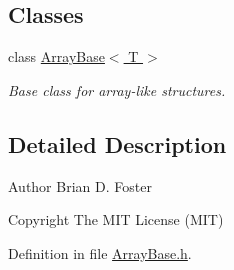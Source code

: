 \subsection*{Classes}
\begin{DoxyCompactItemize}
\item 
class \hyperlink{a00001}{Array\+Base$<$ T $>$}
\begin{DoxyCompactList}\small\item\em Base class for array-\/like structures. \end{DoxyCompactList}\end{DoxyCompactItemize}


\subsection{Detailed Description}
\begin{DoxyAuthor}{Author}
Brian D. Foster 
\end{DoxyAuthor}
\begin{DoxyCopyright}{Copyright}
The M\+I\+T License (M\+I\+T) 
\end{DoxyCopyright}


Definition in file \hyperlink{a00004_source}{Array\+Base.\+h}.

